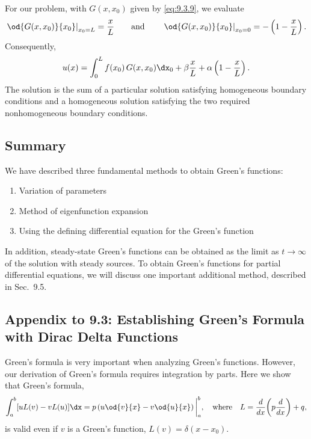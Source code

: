 For our problem, with $G(x,x_0)$ given by \eqref{eq:9.3.9}, we evaluate
\[
\left.\od{G(x,x_0)}{x_0}\right|_{x_0=L} = \frac{x}{L} \qquad\text{and}\qquad \left.\od{G(x,x_0)}{x_0}\right|_{x_0=0} = -\left(1 - \frac{x}{L}\right).
\]
Consequently,
\begin{equation}
\label{eq:9.3.29}
u(x) = \int_0^L f(x_0)\,G(x,x_0)\dx_0 + \beta\frac{x}{L} + \alpha\left(1 - \frac{x}{L}\right).
\end{equation}
The solution is the sum of a particular solution satisfying homogeneous boundary conditions and a homogeneous solution satisfying the two required nonhomogeneous boundary conditions.

\subsection{Summary}
\label{sec:greens-ode-summary}

We have described three fundamental methods to obtain Green's functions:
\begin{enumerate}
\item Variation of parameters
\item Method of eigenfunction expansion
\item Using the defining differential equation for the Green's function
\end{enumerate}

In addition, steady-state Green's functions can be obtained as the limit as $t \to \infty$ of the solution with steady sources.  To obtain Green's functions for partial differential equations, we will discuss one important additional method, described in Sec.~9.5.

\subsection*{Appendix to 9.3: Establishing Green's Formula with Dirac Delta Functions}
\label{sec:greens-appendix}

Green's formula is very important when analyzing Green's functions.  However, our derivation of Green's formula requires integration by parts.  Here we show that Green's formula,
\begin{equation}
\label{eq:9.3.30}
\int_a^b [uL(v) - vL(u)]\dx = p\left(u\od{v}{x} - v\od{u}{x}\right)\bigg|_a^b, \quad\text{where}\quad L = \frac{d}{d x}\!\left(p\frac{d}{d x}\right) + q,
\end{equation}
is valid even if $v$ is a Green's function, $L(v) = \delta(x - x_0)$.

